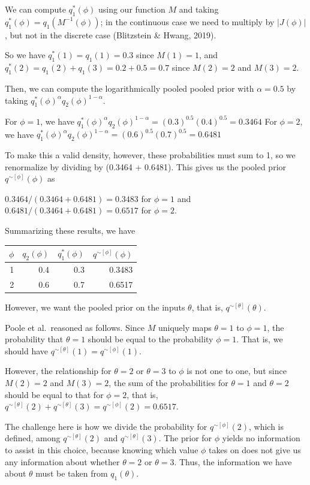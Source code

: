 \documentclass[12pt,twoside]{smiththesis}
\begin{document}
We can compute \(q_1^*(\phi)\) using our function \(M\) and taking \(q_1^*(\phi) = q_1(M^{-1}(\phi))\); in the continuous case we need to multiply by \(|J(\phi)|\), but not in the discrete case (Blitzstein \& Hwang, 2019).

So we have \(q^*_1(1) = q_1(1) = 0.3\) since \(M(1)=1\), and \(q^*_1(2) = q_1(2) + q_1(3) = 0.2 + 0.5=0.7\) since \(M(2) = 2\) and \(M(3)=2\).

Then, we can compute the logarithmically pooled pooled prior with \(\alpha=0.5\) by taking \(q_1^*(\phi)^{\alpha} q_2(\phi)^{1-\alpha}\).

For \(\phi = 1\), we have \(q_1^*(\phi)^{\alpha} q_2(\phi)^{1-\alpha} = (0.3)^{0.5}(0.4)^{0.5} = 0.3464\)
For \(\phi = 2\), we have \(q_1^*(\phi)^{\alpha} q_2(\phi)^{1-\alpha} = (0.6)^{0.5}(0.7)^{0.5} = 0.6481\)

To make this a valid density, however, these probabilities must sum to 1, so we renormalize by dividing by (0.3464 + 0.6481). This gives us the pooled prior \(q^{\sim[\phi]}(\phi)\) as

\(0.3464 / (0.3464 + 0.6481) = 0.3483\) for \(\phi =1\) and \(0.6481 / (0.3464 + 0.6481) =0.6517\) for \(\phi=2\).

Summarizing these results, we have
\begin{table}[H]
\centering
\begin{tabular}[t]{r|r|r|r}
\hline
$\phi$ & $q_2(\phi)$ & $q_1^*(\phi)$ & $q^{\sim[\phi]}(\phi)$\\
\hline
1 & 0.4 & 0.3 & 0.3483\\
\hline
2 & 0.6 & 0.7 & 0.6517\\
\hline
\end{tabular}
\end{table}
However, we want the pooled prior on the inputs \(\theta\), that is, \(q^{\sim[\theta]}(\theta)\).

Poole et al.~reasoned as follows. Since \(M\) uniquely maps \(\theta=1\) to \(\phi =1\), the probability that \(\theta=1\) should be equal to the probability \(\phi = 1\). That is, we should have \(q^{\sim[\theta]}(1) = q^{\sim[\phi]}(1)\).

However, the relationship for \(\theta=2\) or \(\theta=3\) to \(\phi\) is not one to one, but since \(M(2)=2\) and \(M(3)=2\), the sum of the probabilities for \(\theta=1\) and \(\theta=2\) should be equal to that for \(\phi=2\), that is, \(q^{\sim[\theta]}(2) + q^{\sim[\theta]}(3) = q^{\sim[\phi]}(2) = 0.6517\).

The challenge here is how we divide the probability for \(q^{\sim[\phi]}(2)\), which is defined, among \(q^{\sim[\theta]}(2)\) and \(q^{\sim[\theta]}(3)\). The prior for \(\phi\) yields no information to assist in this choice, because knowing which value \(\phi\) takes on does not give us any information about whether \(\theta=2\) or \(\theta=3\). Thus, the information we have about \(\theta\) must be taken from \(q_1(\theta)\).
\end{document}
